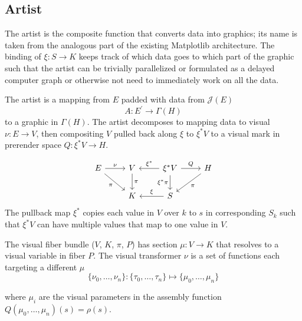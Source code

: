 \documentclass[../main.tex]{subfiles}
\begin{document}
\subsection{Artist}
\label{sec:artist}
The artist is the composite function that converts data into graphics; its name is taken from the analogous part of the existing Matplotlib architecture. The binding of $\xi:S \rightarrow K$ keeps track of which data goes to which part of the graphic such that the artist can be trivially parallelized or formulated as a delayed computer graph or otherwise not need to immediately work on all the data. 

The artist is a mapping from $E$ padded with data from $\mathcal{J}(E)$
\begin{equation}
    A: E^\prime \rightarrow \Gamma(H)
\end{equation}
to a graphic in $\Gamma(H)$. The artist decomposes to mapping data to visual $\nu:E\rightarrow V$, then  compositing $V$ pulled back along $\xi$ to $\xi^*V$ to a visual mark in prerender space $Q:\xi^*V\rightarrow H$. 

\begin{equation}
    \label{eq:artist_diagram}
    \begin{tikzcd}
        E \arrow[r, "\nu"] \arrow[rd, "\pi"'] & V \arrow[d, "\pi"] & \xi^*V \arrow[r, "Q"] \arrow[d, "\xi^*\pi"'] \arrow[l, "\xi^*"'] & H \arrow[ld, "\pi"] \\
                                              & K                  & S \arrow[l, "\xi"']                                              &                    
        \end{tikzcd}
\end{equation}
The pullback map $\xi^*$ copies each value in $V$ over $k$ to $s$ in corresponding $S_k$ such that $\xi^*V$ can have multiple values that map to one value in $V$. 

The visual fiber bundle ($V$, $K$, $\pi$, $P$) has section $\mu: V \rightarrow K$ that resolves to a visual variable \cite{bertinIIPropertiesGraphic2011,munznerMarksChannels,} in fiber $P$. The visual transformer $\nu$ is a set of functions each targeting a different $\mu$
\begin{equation}
    \label{eq:nu_expanded}
    \{\nu_{0}, \ldots, \nu_{n}\}: \{\tau_{0}, \ldots, \tau_{n}\} \mapsto \{\mu_{0}, \ldots, \mu_{n}\}
\end{equation}

where $\mu_{i}$ are the visual parameters in the assembly function $Q(\mu_{0}, \ldots, \mu_{n})(s) = \rho(s)$. 
\end{document}
